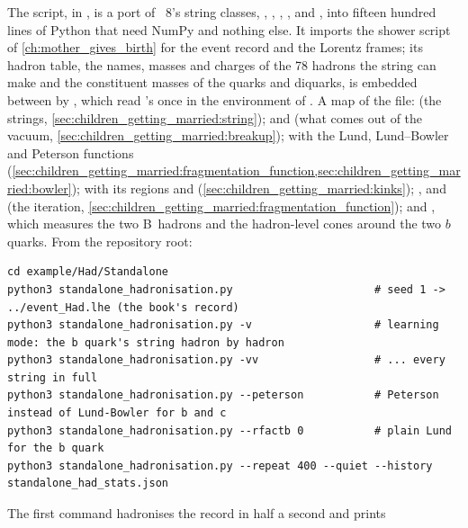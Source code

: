 The script,  in
, is a port of \PYTHIA~8's string classes,
, , ,
,  and , into
fifteen hundred lines of Python that need NumPy and nothing else. It imports
the shower script of \cref{ch:mother_gives_birth} for the event record and
the Lorentz frames; its hadron table, the names, masses and charges of the
78 hadrons the string can make and the constituent masses of the quarks and
diquarks, is embedded between  by
, which read \PYTHIA's  once
in the environment of . A map of the file:
 (the strings, \cref{sec:children_getting_married:string});
 and  (what comes out of the vacuum,
\cref{sec:children_getting_married:breakup});  with the Lund,
Lund--Bowler and Peterson functions (\cref{sec:children_getting_married:fragmentation_function,sec:children_getting_married:bowler});
 with its regions and 
(\cref{sec:children_getting_married:kinks}); ,
 and  (the iteration,
\cref{sec:children_getting_married:fragmentation_function}); and
, which measures the two B~hadrons and the hadron-level
cones around the two $b$ quarks. From the repository root:
\begin{verbatim}
cd example/Had/Standalone
python3 standalone_hadronisation.py                      # seed 1 -> ../event_Had.lhe (the book's record)
python3 standalone_hadronisation.py -v                   # learning mode: the b quark's string hadron by hadron
python3 standalone_hadronisation.py -vv                  # ... every string in full
python3 standalone_hadronisation.py --peterson           # Peterson instead of Lund-Bowler for b and c
python3 standalone_hadronisation.py --rfactb 0           # plain Lund for the b quark
python3 standalone_hadronisation.py --repeat 400 --quiet --history standalone_had_stats.json
\end{verbatim}
The first command hadronises the record in half a second and prints
